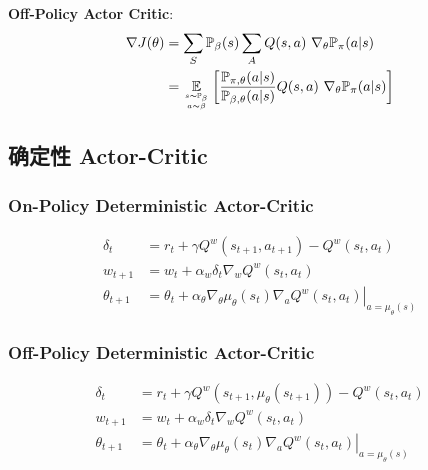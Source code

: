 \documentclass{article}
\begin{document}
            \textbf{Off-Policy Actor Critic}: 
                \begin{align*}
                    \nabla J(\theta) &= \sum_S  \mathbb P_\beta (s) \sum_A Q(s, a)\ \nabla_\theta \mathbb P_\pi (a | s) \\
                    &= \underset{s \sim \mathbb P_\beta \atop a \sim \beta}{\mathbb E} \left[ \frac{\mathbb P_{\pi,\theta}(a|s)}{\mathbb P_{\beta,\theta}(a|s)} Q(s, a)\ \nabla_\theta \mathbb P_\pi (a | s)\right]
                \end{align*}
        
    \subsection{确定性 Actor-Critic}
        \subsubsection{On-Policy Deterministic Actor-Critic}
            \begin{align*}
                \delta_{t} &=r_{t}+\gamma Q^{w}\left(s_{t+1}, a_{t+1}\right)-Q^{w}\left(s_{t}, a_{t}\right) \\
                w_{t+1} &=w_{t}+\alpha_{w} \delta_{t} \nabla_{w} Q^{w}\left(s_{t}, a_{t}\right) \\
                \theta_{t+1} &=\theta_{t}+\left.\alpha_{\theta} \nabla_{\theta} \mu_{\theta}\left(s_{t}\right) \nabla_{a} Q^{w}\left(s_{t}, a_{t}\right)\right|_{a=\mu_{\theta}(s)}
            \end{align*}
            

        
        \subsubsection{Off-Policy Deterministic Actor-Critic}
            \begin{align*}
                \delta_{t} &=r_{t}+\gamma Q^{w}\left(s_{t+1}, \mu_{\theta}\left(s_{t+1}\right)\right)-Q^{w}\left(s_{t}, a_{t}\right) \\
                w_{t+1} &=w_{t}+\alpha_{w} \delta_{t} \nabla_{w} Q^{w}\left(s_{t}, a_{t}\right) \\
                \theta_{t+1} &=\theta_{t}+\left.\alpha_{\theta} \nabla_{\theta} \mu_{\theta}\left(s_{t}\right) \nabla_{a} Q^{w}\left(s_{t}, a_{t}\right)\right|_{a=\mu_{\theta}(s)}
            \end{align*}
            
\end{document}
